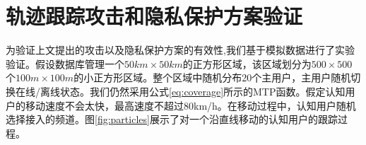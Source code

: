\section{轨迹跟踪攻击和隐私保护方案验证}

为验证上文提出的攻击以及隐私保护方案的有效性,我们基于模拟数据进行了实验验证。假设数据库管理一个$50km \times 50km$的正方形区域，该区域划分为$500 \times 500$个$100m \times 100m$的小正方形区域。整个区域中随机分布20个主用户，主用户随机切换在线/离线状态。我们仍然采用公式\ref{eq:coverage}所示的MTP函数。假定认知用户的移动速度不会太快，最高速度不超过80km/h。在移动过程中，认知用户随机选择接入的频道。图\ref{fig:particles}展示了对一个沿直线移动的认知用户的跟踪过程。

\begin{figure}
\centering
{}
\hfill
{}


\end{figure}
